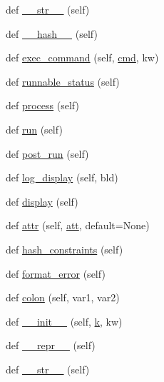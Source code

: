 \begin{DoxyCompactItemize}
def \hyperlink{classwaflib_1_1_task_1_1_task_base_a07123f80c95b1d17a699064cd10d8885}{\+\_\+\+\_\+str\+\_\+\+\_\+} (self)
\item 
def \hyperlink{classwaflib_1_1_task_1_1_task_base_a5e02f89716bcd37b2490adc0861c4bdd}{\+\_\+\+\_\+hash\+\_\+\+\_\+} (self)
\item 
def \hyperlink{classwaflib_1_1_task_1_1_task_base_a6326ff82d67a2b629c8d78b95cb8fec6}{exec\+\_\+command} (self, \hyperlink{sndfile__play_8m_adfc5ba7e22f5e4a6221c12a70503bef3}{cmd}, kw)
\item 
def \hyperlink{classwaflib_1_1_task_1_1_task_base_a10c4597d9085bd1680f9b3eb28e23899}{runnable\+\_\+status} (self)
\item 
def \hyperlink{classwaflib_1_1_task_1_1_task_base_ae5e951a187c8d09c31960bbcf76fad25}{process} (self)
\item 
def \hyperlink{classwaflib_1_1_task_1_1_task_base_ae549bc1a80fd94cc94fd1e764c76895c}{run} (self)
\item 
def \hyperlink{classwaflib_1_1_task_1_1_task_base_a21b09d3f18df76e1d8b0719f321ea3bd}{post\+\_\+run} (self)
\item 
def \hyperlink{classwaflib_1_1_task_1_1_task_base_adf380fd031fc987f4dcd54e1f70420a7}{log\+\_\+display} (self, bld)
\item 
def \hyperlink{classwaflib_1_1_task_1_1_task_base_a838316cf55ac50fab2ae0e8771917e74}{display} (self)
\item 
def \hyperlink{classwaflib_1_1_task_1_1_task_base_a8ead2ec09545f4e9e27d6b40f9f80eaa}{attr} (self, \hyperlink{filters_8h_a6cbe32dd86cefd1a8b182b3ee652e9bf}{att}, default=None)
\item 
def \hyperlink{classwaflib_1_1_task_1_1_task_base_ad4f2583a59ff62565735490154826033}{hash\+\_\+constraints} (self)
\item 
def \hyperlink{classwaflib_1_1_task_1_1_task_base_a321e667402035aa56626ee6f7b3b8223}{format\+\_\+error} (self)
\item 
def \hyperlink{classwaflib_1_1_task_1_1_task_base_ae9648ec691e059291a79f38ef6ee12cc}{colon} (self, var1, var2)
\item 
def \hyperlink{classwaflib_1_1_task_1_1_task_base_add6ae927b00bd1f14d5b87738dd53e70}{\+\_\+\+\_\+init\+\_\+\+\_\+} (self, \hyperlink{rfft2d_test_m_l_8m_adc468c70fb574ebd07287b38d0d0676d}{k}, kw)
\item 
def \hyperlink{classwaflib_1_1_task_1_1_task_base_a004a67fbb5d7e36d1a6ba48390e0d5f7}{\+\_\+\+\_\+repr\+\_\+\+\_\+} (self)
\item 
def \hyperlink{classwaflib_1_1_task_1_1_task_base_a07123f80c95b1d17a699064cd10d8885}{\+\_\+\+\_\+str\+\_\+\+\_\+} (self)

\end{DoxyCompactItemize}
